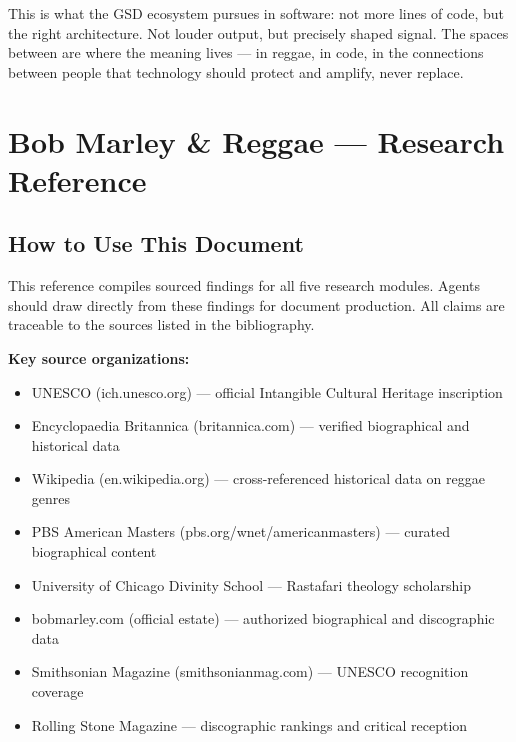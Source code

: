 \documentclass[11pt,letterpaper]{article}
\newcommand{\stageheader}[2]{%
  \noindent\colorbox{#2}{\makebox[\textwidth][l]{%
    \textcolor{white}{\bfseries\sffamily\hspace{6pt}#1\hspace{6pt}}}}%
  \vspace{0.5em}\par%
}
\begin{document}
This is what the GSD ecosystem pursues in software: not more lines of code, but the right architecture. Not louder output, but precisely shaped signal. The spaces between are where the meaning lives --- in reggae, in code, in the connections between people that technology should protect and amplify, never replace.

\newpage

\stageheader{STAGE 2 --- RESEARCH REFERENCE}{secondary}

\section{Bob Marley \& Reggae --- Research Reference}

\subsection{How to Use This Document}

This reference compiles sourced findings for all five research modules. Agents should draw directly from these findings for document production. All claims are traceable to the sources listed in the bibliography.

\textbf{Key source organizations:}
\begin{itemize}[noitemsep]
  \item UNESCO (ich.unesco.org) --- official Intangible Cultural Heritage inscription
  \item Encyclopaedia Britannica (britannica.com) --- verified biographical and historical data
  \item Wikipedia (en.wikipedia.org) --- cross-referenced historical data on reggae genres
  \item PBS American Masters (pbs.org/wnet/americanmasters) --- curated biographical content
  \item University of Chicago Divinity School --- Rastafari theology scholarship
  \item bobmarley.com (official estate) --- authorized biographical and discographic data
  \item Smithsonian Magazine (smithsonianmag.com) --- UNESCO recognition coverage
  \item Rolling Stone Magazine --- discographic rankings and critical reception
\end{itemize}
\end{document}
